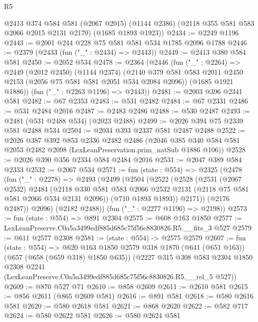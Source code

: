 \begin{lexlean}{R5}
\begin{coremodule}
    @2413
      @374
      @584
      @581
      (@2067 @2015)
      (@1144 @2386)
      (@2118 @355 @581 @583 @2066 @2015 @2131 @2170)
      (@1685 @1893 @1923))
@2434 := @2249 @1196
@2443 := @2001 @244 @228 @75 @581 @581 @534 @1785 @2096 @1788
@2446 := @2379 (@2433 (fun ("_" : @2434) => @2443))
@2449 := @2413 @380 @584 @581
@2450 := @2052 @534
@2478 := @2364
    (@2446
      (fun ("_" : @2264) =>
      @2449
        (@2012 @2450)
        (@1144 @2374)
        (@2140 @379 @581 @583 @2011 @2450 @2153 (@2056 @75 @581 @581 @2051 @534 @2084 @2096))
        (@1685 @1921 @1886))
      (fun ("_" : @2263 @1196) => @2443))
@2481 := @2003 @396 @2341 @581
@2482 := @67 @2353
@2483 := @531 @2482
@2484 := @67 @2331
@2486 := @531 @2484 @2016
@2487 := @2483 @2486
@2488 := @530 @2487
@2493 := @2481 (@531 @2488 @534) (@2023 @2488)
@2499 := @2026 @394 @75 @2339 @581 @2488 @534
@2504 := @2034 @393 @2337 @581 @2487 @2488
@2522 := @2026
    @387
    @392
    @853
    @2336
    @2482
    @2486
    (@2046 @385 @340 @584 @581 @2053 @2482 @2098 (LexLeanPreservation.prim_natSub @1886 @106))
@2528 := @2026 @390 @356 @2334 @584 @2484 @2016
@2531 := @2047 @389 @584 @2333
@2532 := @2067 @534
@2571 := fun (state : @554) =>
  @2325
    (@2478
      (fun ("_" : @2278) =>
      @2493
        (@2499
          (@2504
            (@2522
              (@2528
                (@2531
                  (@2067 @2532)
                  @2484
                  (@2118
                    @330
                    @581
                    @583
                    @2066
                    @2532
                    @2131
                    (@2118 @75 @581 @581 @2066 @534 @2131 @2096))
                  (@710 @1893 @1893))
                @2171))
            (@2176 @2487))
          @2096)
        (@2182 @2488))
      (fun ("_" : @2277 @1196) => @2198))
@2573 := fun (state : @554) => @891 @2304
@2575 := @608 @163 @1850
@2577 := LexLeanPreserve.C0a5a3499edf885d685c75f56c8830826.R5.__fits_3 @527
@2579 := @611 @2577 @2308
@2581 := (state : @554) -> @2575 @2579
@2607 := fun (state : @554) =>
  @620
    @163
    @1850
    @2579
    @318
    @1870
    (@641 (@651 @163))
    (@657 (@658 (@659 @318) @1850 @635))
    (@2227
      @315
      @308
      @583
      @2304
      @1850
      @2308
      @2241
      (LexLeanPreserve.C0a5a3499edf885d685c75f56c8830826.R5.__rel_5 @527))
@2609 := @870 @527 @71
@2610 := @858 @2609
@2611 := @2610 @581
@2615 := @856 @2611 (@865 @2609 @581)
@2616 := @891 @581
@2618 := @580 @2616 @581
@2620 := @580 @2618 @581
@2621 := @868 @2620
@2622 := @582 @717
@2624 := @580 @2622 @581
@2626 := @580 @2624 @581

\end{coremodule}
\end{lexlean}
